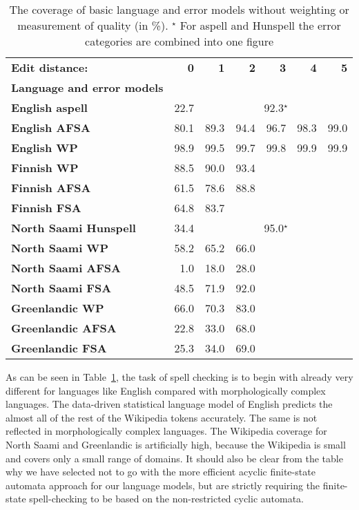 \documentclass[a4paper,12pt]{article}
\begin{document}
\begin{table}
    \centering
    \begin{tabular}{|l|r|r|r|r|r|r|}
        \hline
        \bf Edit distance: & \bf 0  & \bf 1 & \bf 2 & \bf 3 & \bf 4 & \bf 5 \\
        \bf Language and error models &   &  &  &  &  &  \\
        \hline
    \bf English aspell & 22.7 & \multicolumn{5}{|c|}{92.3$^\star$}  \\
        \bf English AFSA   & 80.1 & 89.3 & 94.4 & 96.7 & 98.3 & 99.0 \\
            \bf English WP & 98.9 & 99.5 & 99.7 & 99.8 & 99.9 & 99.9 \\
        \hline
                   \bf Finnish WP  & 88.5 & 90.0 & 93.4 & & & \\
                  \bf Finnish AFSA & 61.5 & 78.6 & 88.8 & & & \\
                  \bf Finnish FSA  & 64.8 & 83.7 & & & & \\
        \hline
        \bf North Saami Hunspell & 34.4 & \multicolumn{5}{|c|}{95.0$^\star$} \\
        \bf North Saami WP & 58.2 & 65.2 & 66.0 & & & \\
               \bf North Saami AFSA & 1.0 & 18.0 & 28.0 & & & \\
               \bf North Saami FSA & 48.5 & 71.9 & 92.0 & & & \\
        \hline
        \bf Greenlandic WP            & 66.0 & 70.3 & 83.0 & & & \\
                 \bf Greenlandic AFSA & 22.8 & 33.0 & 68.0 & & & \\
                  \bf Greenlandic FSA & 25.3 & 34.0 & 69.0 & & & \\
        \hline
    \end{tabular}
    \caption{The coverage of basic language and error models without weighting
        or measurement of quality (in \%).
    $^\star$ For aspell and Hunspell the error categories are combined into one
    figure\label{table:coverage}}
\end{table}

As can be seen in Table~\ref{table:coverage}, the task of spell checking is to
begin with already very different for languages like English compared
with morphologically complex languages. The data-driven statistical language
model of English predicts the almost all of the rest of the Wikipedia tokens
accurately. The same is not reflected in morphologically complex languages.
The Wikipedia coverage for North Saami and Greenlandic is artificially high,
because the Wikipedia is small and covers only a small range of domains.
It
should also be clear from the table why we have selected not to go with the
more efficient acyclic finite-state automata approach for our language models,
but are strictly requiring the finite-state spell-checking to be based on the
non-restricted cyclic automata.
\end{document}
